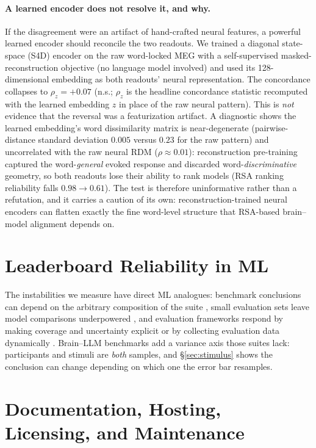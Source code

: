 \documentclass{article}
\begin{document}
\paragraph{A learned encoder does not resolve it, and why.} If the disagreement were an artifact of
hand-crafted neural features, a powerful learned encoder should reconcile the two readouts. We
trained a diagonal state-space (S4D) encoder on the raw word-locked MEG with a self-supervised
masked-reconstruction objective (no language model involved) and used its 128-dimensional embedding
as both readouts' neural representation. The concordance collapses to $\rho_z = +0.07$ (n.s.;
$\rho_z$ is the headline concordance statistic recomputed with the learned embedding $z$ in place
of the raw neural pattern). This
is \emph{not} evidence that the reversal was a featurization artifact. A diagnostic shows the
learned embedding's word dissimilarity matrix is near-degenerate (pairwise-distance standard
deviation $0.005$ versus $0.23$ for the raw pattern) and uncorrelated with the raw neural RDM
($\rho \approx 0.01$): reconstruction pre-training captured the word-\emph{general} evoked response
and discarded word-\emph{discriminative} geometry, so both readouts lose their ability to rank
models (RSA ranking reliability falls $0.98 \to 0.61$). The test is therefore uninformative rather
than a refutation, and it carries a caution of its own: reconstruction-trained neural encoders can
flatten exactly the fine word-level structure that RSA-based brain--model alignment depends on.

\section{Leaderboard Reliability in ML}\label{app:related-ml}

The instabilities we measure have direct ML analogues: benchmark conclusions can depend on the
arbitrary composition of the suite \citep{dehghani2021benchmark}, small evaluation sets leave
model comparisons underpowered \citep{card2020little}, and evaluation frameworks respond by
making coverage and uncertainty explicit \citep{liang2023holistic} or by collecting evaluation data
dynamically \citep{kiela2021dynabench}.
Brain--LLM benchmarks add a variance axis those suites lack: participants and stimuli are
\emph{both} samples, and \S\ref{sec:stimulus} shows the conclusion can change depending on
which one the error bar resamples.

\section*{Documentation, Hosting, Licensing, and Maintenance}\label{availability}
\end{document}
